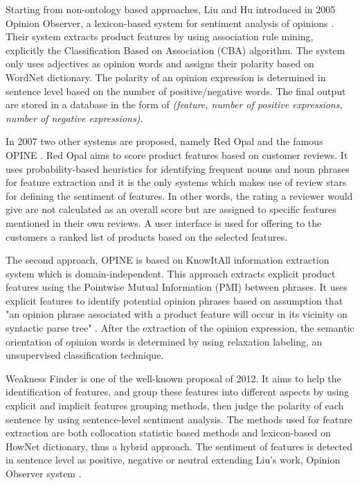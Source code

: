 Starting from non-ontology based approaches,  Liu and Hu introduced in 2005 Opinion Observer, a lexicon-based system for sentiment analysis of opinions \cite{liu2005opinion,hu2004mining}. Their system extracts product features by using association rule mining, explicitly the Classification Based on Association (CBA) algorithm. The system only uses adjectives as opinion words and assigns their polarity based on WordNet dictionary. The polarity of an opinion expression is determined in sentence level based on the number of positive/negative words. The final output are stored in a database in the form of \textit{(feature, number of positive expressions, number of negative expressions)}. 

In 2007 two other systems are proposed, namely Red Opal \cite{scaffidi2007red} and the famous OPINE \cite{popescu2007extracting}. Red Opal aims to score product features based on customer reviews. It uses probability-based heuristics for identifying frequent nouns and noun phrases for feature extraction and it is the only systems which makes use of review stars for defining the sentiment of features. In other words, the rating a reviewer would give are not calculated as an overall score but are assigned to specific features mentioned in their own reviews. A user interface is used for offering to the customers a ranked list of products based on the selected features. 

The second approach, OPINE \cite{popescu2007extracting} is based on KnowItAll information extraction system which is domain-independent. This approach  extracts explicit product features using the Pointwise Mutual Information (PMI) between phrases. It uses explicit features to identify potential opinion phrases based on assumption that "an opinion phrase associated with a product feature will occur in its vicinity on syntactic parse tree" \cite{popescu2007extracting}. After the extraction of the opinion expression, the semantic orientation of opinion words is determined by using relaxation labeling, an unsupervised classification technique.  

Weakness Finder \cite{zhang2012weakness} is one of the well-known proposal of 2012. It aims to help the identification of features, and group these features into different aspects by using explicit and implicit features grouping methods, then judge the polarity of each sentence by using sentence-level sentiment analysis. The methods used for feature extraction are both collocation statistic based methods and lexicon-based on HowNet dictionary, thus a hybrid approach. The sentiment of features is detected in sentence level as positive, negative or neutral extending Liu's work, Opinion Observer system \cite{liu2005opinion}.

